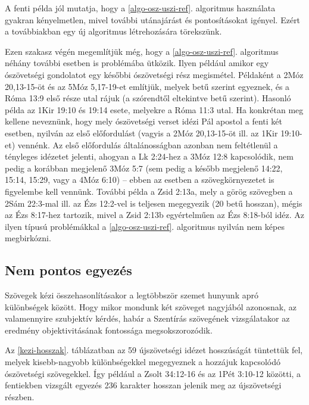 \documentclass{article}
\begin{document}
A fenti példa jól mutatja, hogy a \ref{algo-osz-uszi-ref}. algoritmus használata gyakran
kényelmetlen, mivel további utánajárást és pontosításokat igényel. Ezért a továbbiakban
egy új algoritmus létrehozására törekszünk.

Ezen szakasz végén megemlítjük még, hogy a \ref{algo-osz-uszi-ref}. algoritmus néhány további
esetben is problémába ütközik. Ilyen például amikor egy ószövetségi gondolatot egy későbbi
ószövetségi rész megismétel. Példaként a 2Móz 20,13-15-öt és az 5Móz 5,17-19-et említjük,
melyek betű szerint egyeznek, és a Róma 13:9 első része utal rájuk (a szórendtől eltekintve
betű szerint). Hasonló példa az 1Kir 19:10 és 19:14 esete, melyekre a Róma 11:3 utal.
Ha konkrétan meg kellene neveznünk, hogy mely ószövetségi verset idézi Pál apostol a fenti
két esetben, nyilván az első előfordulást (vagyis a 2Móz 20,13-15-öt ill. az 1Kir 19:10-et)
vennénk. Az első előfordulás általánosságban azonban nem feltétlenül a tényleges idézetet jelenti,
ahogyan a Lk 2:24-hez a 3Móz 12:8 kapcsolódik, nem pedig a korábban megjelenő 3Móz 5:7
(sem pedig a később megjelenő 14:22, 15:14, 15:29, vagy a 4Móz 6:10) -- ebben az esetben
a szövegkörnyezetet is figyelembe kell vennünk. További példa a Zsid 2:13a, mely a görög
szövegben a 2Sám 22:3-mal ill. az Ézs 12:2-vel is teljesen megegyezik (20 betű hosszan),
mégis az Ézs 8:17-hez tartozik, mivel a Zsid 2:13b egyértelműen az Ézs 8:18-ból idéz.
Az ilyen típusú problémákkal a \ref{algo-osz-uszi-ref}. algoritmus nyilván nem képes megbirkózni.

\subsection{Nem pontos egyezés}

Szövegek kézi összehasonlításakor a legtöbbször szemet hunyunk apró különbségek
között. Hogy mikor mondunk két szöveget nagyjából azonosnak, az valamennyire
szubjektív kérdés, habár a Szentírás szövegének vizsgálatakor
az eredmény objektivitásának fontossága megsokszorozódik.

Az \ref{kezi-hosszak}. táblázatban az 59 újszövetségi idézet hosszúságát tüntettük fel,
melyek kisebb-nagyobb különbségekkel megegyeznek a hozzájuk kapcsolódó ószövetségi
szövegekkel. Így például a Zsolt 34:12-16 és az 1Pét 3:10-12 közötti, a fentiekben
vizsgált egyezés 236 karakter hosszan jelenik meg az újszövetségi részben.
\end{document}
